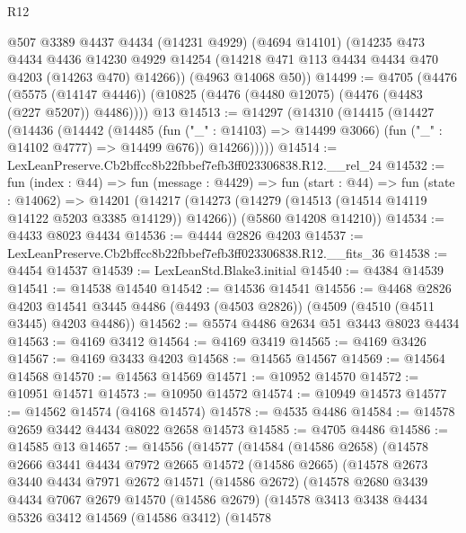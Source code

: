 \begin{lexlean}{R12}
\begin{coremodule}
      @507
      @3389
      @4437
      @4434
      (@14231 @4929)
      (@4694 @14101)
      (@14235
        @473
        @4434
        @4436
        @14230
        @4929
        @14254
        (@14218 @471 @113 @4434 @4434 @470 @4203 (@14263 @470) @14266))
      (@4963 @14068 @50))
@14499 := @4705
    (@4476
      (@5575 (@14147 @4446))
      (@10825 (@4476 (@4480 @12075) (@4476 (@4483 (@227 @5207)) @4486))))
    @13
@14513 := @14297
    (@14310
      (@14415
        (@14427
          (@14436
            (@14442
              (@14485
                (fun ("_" : @14103) => @14499 @3066)
                (fun ("_" : @14102 @4777) => @14499 @676))
              @14266)))))
@14514 := LexLeanPreserve.Cb2bffcc8b22fbbef7efb3ff023306838.R12.__rel_24
@14532 := fun (index : @44) =>
  fun (message : @4429) =>
  fun (start : @44) =>
  fun (state : @14062) =>
  @14201
    (@14217
      (@14273 (@14279 (@14513 (@14514 @14119 @14122 @5203 @3385 @14129)) @14266))
      (@5860 @14208 @14210))
@14534 := @4433 @8023 @4434
@14536 := @4444 @2826 @4203
@14537 := LexLeanPreserve.Cb2bffcc8b22fbbef7efb3ff023306838.R12.__fits_36
@14538 := @4454 @14537
@14539 := LexLeanStd.Blake3.initial
@14540 := @4384 @14539
@14541 := @14538 @14540
@14542 := @14536 @14541
@14556 := @4468
    @2826
    @4203
    @14541
    @3445
    @4486
    (@4493 (@4503 @2826))
    (@4509 (@4510 (@4511 @3445) @4203 @4486))
@14562 := @5574 @4486 @2634 @51 @3443 @8023 @4434
@14563 := @4169 @3412
@14564 := @4169 @3419
@14565 := @4169 @3426
@14567 := @4169 @3433 @4203
@14568 := @14565 @14567
@14569 := @14564 @14568
@14570 := @14563 @14569
@14571 := @10952 @14570
@14572 := @10951 @14571
@14573 := @10950 @14572
@14574 := @10949 @14573
@14577 := @14562 @14574 (@4168 @14574)
@14578 := @4535 @4486
@14584 := @14578 @2659 @3442 @4434 @8022 @2658 @14573
@14585 := @4705 @4486
@14586 := @14585 @13
@14657 := @14556
    (@14577
      (@14584
        (@14586 @2658)
        (@14578
          @2666
          @3441
          @4434
          @7972
          @2665
          @14572
          (@14586 @2665)
          (@14578
            @2673
            @3440
            @4434
            @7971
            @2672
            @14571
            (@14586 @2672)
            (@14578
              @2680
              @3439
              @4434
              @7067
              @2679
              @14570
              (@14586 @2679)
              (@14578
                @3413
                @3438
                @4434
                @5326
                @3412
                @14569
                (@14586 @3412)
                (@14578

\end{coremodule}
\end{lexlean}
